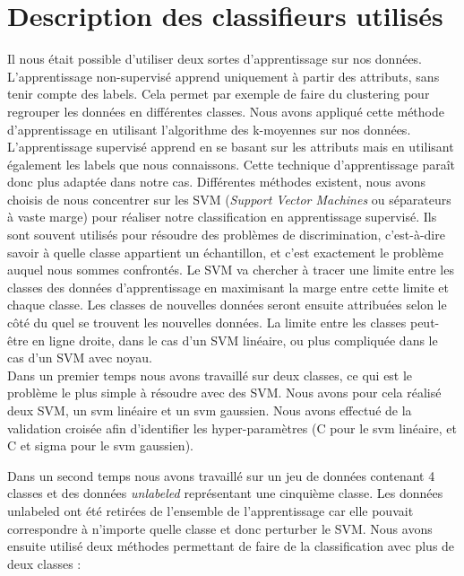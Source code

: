\section{Description des classifieurs utilisés}

	Il nous était possible d'utiliser deux sortes d'apprentissage sur nos données. L'apprentissage non-supervisé apprend uniquement à partir des attributs, sans tenir compte des labels. Cela permet par exemple de faire du clustering pour regrouper les données en différentes classes. Nous avons appliqué cette méthode d'apprentissage en utilisant l'algorithme des k-moyennes sur nos données.\\

	L'apprentissage supervisé apprend en se basant sur les attributs mais en utilisant également les labels que nous connaissons. Cette technique d'apprentissage paraît donc plus adaptée dans notre cas. Différentes méthodes existent, nous avons choisis de nous concentrer sur les SVM (\emph{Support Vector Machines} ou séparateurs à vaste marge) pour réaliser notre classification en apprentissage supervisé. Ils sont souvent utilisés pour résoudre des problèmes de discrimination, c'est-à-dire savoir à quelle classe appartient un échantillon, et c'est exactement le problème auquel nous sommes confrontés. Le SVM va chercher à tracer une limite entre les classes des données d'apprentissage en maximisant la marge entre cette limite et chaque classe. Les classes de nouvelles données seront ensuite attribuées selon le côté du quel se trouvent les nouvelles données. La limite entre les classes peut-être en ligne droite, dans le cas d'un SVM linéaire, ou plus compliquée dans le cas d'un SVM avec noyau.\\

	Dans un premier temps nous avons travaillé sur deux classes, ce qui est le problème le plus simple à résoudre avec des SVM. Nous avons pour cela réalisé deux SVM, un svm linéaire et un svm gaussien. Nous avons effectué de la validation croisée afin d'identifier les hyper-paramètres (C pour le svm linéaire, et C et sigma pour le svm gaussien).

	Dans un second temps nous avons travaillé sur un jeu de données contenant 4 classes et des données \emph{unlabeled} représentant une cinquième classe. Les données unlabeled ont été retirées de l'ensemble de l'apprentissage car elle pouvait correspondre à n'importe quelle classe et donc perturber le SVM.
	Nous avons ensuite utilisé deux méthodes permettant de faire de la classification avec plus de deux classes :

